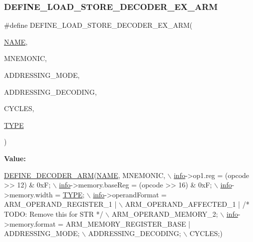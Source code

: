 \subsubsection{\texorpdfstring{D\+E\+F\+I\+N\+E\+\_\+\+L\+O\+A\+D\+\_\+\+S\+T\+O\+R\+E\+\_\+\+D\+E\+C\+O\+D\+E\+R\+\_\+\+E\+X\+\_\+\+A\+RM}{DEFINE\_LOAD\_STORE\_DECODER\_EX\_ARM}}
{\footnotesize\ttfamily \#define D\+E\+F\+I\+N\+E\+\_\+\+L\+O\+A\+D\+\_\+\+S\+T\+O\+R\+E\+\_\+\+D\+E\+C\+O\+D\+E\+R\+\_\+\+E\+X\+\_\+\+A\+RM(\begin{DoxyParamCaption}\item[{}]{\mbox{\hyperlink{inflate_8h_a164ea0159d5f0b5f12a646f25f99eceaa67bc2ced260a8e43805d2480a785d312}{N\+A\+ME}},  }\item[{}]{M\+N\+E\+M\+O\+N\+IC,  }\item[{}]{A\+D\+D\+R\+E\+S\+S\+I\+N\+G\+\_\+\+M\+O\+DE,  }\item[{}]{A\+D\+D\+R\+E\+S\+S\+I\+N\+G\+\_\+\+D\+E\+C\+O\+D\+I\+NG,  }\item[{}]{C\+Y\+C\+L\+ES,  }\item[{}]{\mbox{\hyperlink{inflate_8h_a164ea0159d5f0b5f12a646f25f99eceaab47ea8bb955afd0adc0ef98517dd6084}{T\+Y\+PE}} }\end{DoxyParamCaption})}

{\bfseries Value\+:}
\begin{DoxyCode}
\mbox{\hyperlink{decoder-arm_8c_a4fe6e4683fda92c7774b0678f5ab95cc}{DEFINE\_DECODER\_ARM}}(\mbox{\hyperlink{inflate_8h_a164ea0159d5f0b5f12a646f25f99eceaa67bc2ced260a8e43805d2480a785d312}{NAME}}, MNEMONIC, \(\backslash\)
        \mbox{\hyperlink{libretro_8h_structretro__game__info}{info}}->op1.reg = (opcode >> 12) & 0xF; \(\backslash\)
        \mbox{\hyperlink{libretro_8h_structretro__game__info}{info}}->memory.baseReg = (opcode >> 16) & 0xF; \(\backslash\)
        \mbox{\hyperlink{libretro_8h_structretro__game__info}{info}}->memory.width = \mbox{\hyperlink{inflate9_8h_a164ea0159d5f0b5f12a646f25f99eceaab47ea8bb955afd0adc0ef98517dd6084}{TYPE}}; \(\backslash\)
        \mbox{\hyperlink{libretro_8h_structretro__game__info}{info}}->operandFormat = ARM\_OPERAND\_REGISTER\_1 | \(\backslash\)
            ARM\_OPERAND\_AFFECTED\_1 | \textcolor{comment}{/* TODO: Remove this for STR */} \(\backslash\)
            ARM\_OPERAND\_MEMORY\_2; \(\backslash\)
        \mbox{\hyperlink{libretro_8h_structretro__game__info}{info}}->memory.format = ARM\_MEMORY\_REGISTER\_BASE | ADDRESSING\_MODE; \(\backslash\)
        ADDRESSING\_DECODING; \(\backslash\)
        CYCLES;)
\end{DoxyCode}
\mbox{\label{decoder-arm_8c_ab31bf408eb3c9556d621cfa92cfcda18}} 
